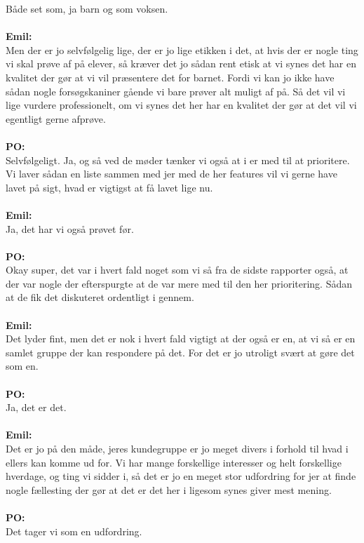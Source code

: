 Både set som, ja barn og som voksen.
\\\\
\textbf{Emil:}\\
Men der er jo selvfølgelig lige, der er jo lige etikken i det, at hvis der er nogle ting vi skal prøve af på elever, så kræver det jo sådan rent etisk at vi synes det har en kvalitet der gør at vi vil præsentere det for barnet.
Fordi vi kan jo ikke have sådan nogle forsøgskaniner gående vi bare prøver alt muligt af på.
Så det vil vi lige vurdere professionelt, om vi synes det her har en kvalitet der gør at det vil vi egentligt gerne afprøve.
\\\\
\textbf{PO:}\\
Selvfølgeligt.
Ja, og så ved de møder tænker vi også at i er med til at prioritere. 
Vi laver sådan en liste sammen med jer med de her features vil vi gerne have lavet på sigt, hvad er vigtigst at få lavet lige nu.
\\\\
\textbf{Emil:}\\
Ja, det har vi også prøvet før. 
\\\\
\textbf{PO:}\\
Okay super, det var i hvert fald noget som vi så fra de sidste rapporter også, at der var nogle der efterspurgte at de var mere med til den her prioritering. 
Sådan at de fik det diskuteret ordentligt i gennem.
\\\\
\textbf{Emil:}\\
Det lyder fint, men det er nok i hvert fald vigtigt at der også er en, at vi så er en samlet gruppe der kan respondere på det.
For det er jo utroligt svært at gøre det som en.
\\\\
\textbf{PO:}\\
Ja, det er det. 
\\\\
\textbf{Emil:}\\
Det er jo på den måde, jeres kundegruppe er jo meget divers i forhold til hvad i ellers kan komme ud for.
Vi har mange forskellige interesser og helt forskellige hverdage, og ting vi sidder i, så det er jo en meget stor udfordring for jer at finde nogle fællesting der gør at det er det her i ligesom synes giver mest mening.
\\\\
\textbf{PO:}\\
Det tager vi som en udfordring.
